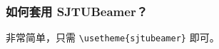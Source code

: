 \begin{frame}
    \frametitle{如何套用 SJTUBeamer？}

    非常简单，只需 \texttt{\textbackslash{}usetheme\{sjtubeamer\}} 即可。

\end{frame}